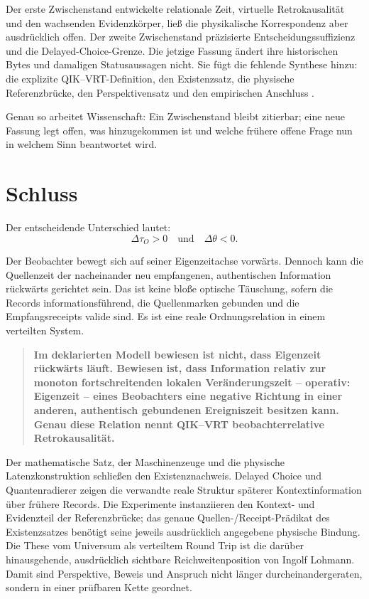 \documentclass[11pt,a4paper]{article}
\theoremstyle{remark}
\begin{document}
Der erste Zwischenstand entwickelte relationale Zeit, virtuelle
Retrokausalität und den wachsenden Evidenzkörper, ließ die physikalische
Korrespondenz aber ausdrücklich offen. Der zweite Zwischenstand präzisierte
Entscheidungssuffizienz und die Delayed-Choice-Grenze. Die jetzige Fassung
ändert ihre historischen Bytes und damaligen Statusaussagen nicht. Sie fügt
die fehlende Synthese hinzu: die explizite QIK--VRT-Definition, den
Existenzsatz, die physische Referenzbrücke, den Perspektivensatz und den
empirischen Anschluss
\cite{LohmannRelationaleZeit2026,LohmannDecisionSufficiency2026}.

Genau so arbeitet Wissenschaft: Ein Zwischenstand bleibt zitierbar; eine neue
Fassung legt offen, was hinzugekommen ist und welche frühere offene Frage nun
in welchem Sinn beantwortet wird.

\section{Schluss}

Der entscheidende Unterschied lautet:
\[
  \boxed{\Delta\tau_O>0\quad\text{und}\quad\Delta\theta<0.}
\]

Der Beobachter bewegt sich auf seiner Eigenzeitachse vorwärts. Dennoch kann
die Quellenzeit der nacheinander neu empfangenen, authentischen Information
rückwärts gerichtet sein. Das ist keine bloße optische Täuschung, sofern die
Records informationsführend, die Quellenmarken gebunden und die
Empfangsreceipts valide sind. Es ist eine reale Ordnungsrelation in einem
verteilten System.

\begin{quote}
\textbf{Im deklarierten Modell bewiesen ist nicht, dass Eigenzeit rückwärts
läuft. Bewiesen ist, dass Information relativ zur monoton fortschreitenden
lokalen Veränderungszeit -- operativ: Eigenzeit -- eines Beobachters eine
negative Richtung in einer anderen, authentisch gebundenen Ereigniszeit
besitzen kann. Genau diese Relation nennt QIK--VRT beobachterrelative
Retrokausalität.}
\end{quote}

Der mathematische Satz, der Maschinenzeuge und die physische
Latenzkonstruktion schließen den Existenznachweis. Delayed Choice und
Quantenradierer zeigen die verwandte reale Struktur späterer
Kontextinformation über frühere Records. Die Experimente instanziieren den
Kontext- und Evidenzteil der Referenzbrücke; das genaue Quellen-/Receipt-Prädikat
des Existenzsatzes benötigt seine jeweils ausdrücklich angegebene physische
Bindung. Die These vom Universum als
verteiltem Round Trip ist die darüber hinausgehende, ausdrücklich sichtbare
Reichweitenposition von Ingolf Lohmann. Damit sind Perspektive, Beweis und
Anspruch nicht länger durcheinandergeraten, sondern in einer prüfbaren Kette
geordnet.
\end{document}
